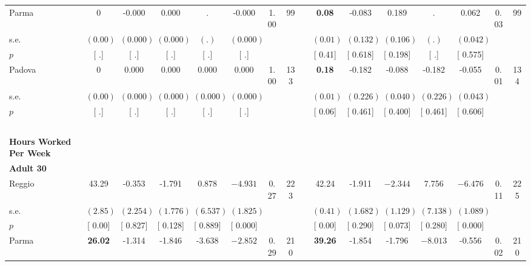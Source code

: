 \begin{longtable}{L{8em} c c c c c c c p{1em} c c c c c c c}
\quad \quad \quad Parma& 0 &    -0.000 &     0.000 &         . &    -0.000 &      1.00 &        99 & & \textbf{     0.08} &    -0.083 &     0.189 &         . &     0.062 &      0.03 &        99  \\*
\quad \quad \quad \quad s.e.& $ (     0.00)$ & $ (    0.000)$ & $ (    0.000)$ & $ (        .)$ & $ (    0.000)$ & & & & $ (     0.01)$ & $ (    0.132)$ & $ (    0.106)$ & $ (        .)$ & $ (    0.042)$ & &  \\*
\quad \quad \quad \quad $ p$ & [        .] & [        .] & [        .] & [        .] & [        .] & & & & [     0.41] & [    0.618] & [    0.198] & [        .] & [    0.575] & &  \\[1em]
\quad \quad \quad Padova& 0 &     0.000 &     0.000 &     0.000 &     0.000 &      1.00 &       133 & & \textbf{     0.18} &    -0.182 &    -0.088 &    -0.182 &    -0.055 &      0.01 &       134  \\*
\quad \quad \quad \quad s.e.& $ (     0.00)$ & $ (    0.000)$ & $ (    0.000)$ & $ (    0.000)$ & $ (    0.000)$ & & & & $ (     0.01)$ & $ (    0.226)$ & $ (    0.040)$ & $ (    0.226)$ & $ (    0.043)$ & &  \\*
\quad \quad \quad \quad $ p$ & [        .] & [        .] & [        .] & [        .] & [        .] & & & & [     0.06] & [    0.461] & [    0.400] & [    0.461] & [    0.606] & &  \\[1em]
~\\[1em]
\textbf{Hours Worked Per Week} \\*
\quad \quad \textbf{Adult 30} & & & & & & & & & & & & & & & \\* 
\quad \quad \quad Reggio& 43.29 &    -0.353 &    -1.791 &     0.878 & $ \mathbf{   -4.931}$ &      0.27 &       223 & & 42.24 &    -1.911 & $ \mathbf{   -2.344}$ &     7.756 & $ \mathbf{   -6.476}$ &      0.11 &       225  \\*
\quad \quad \quad \quad s.e.& $ (     2.85)$ & $ (    2.254)$ & $ (    1.776)$ & $ (    6.537)$ & $ (    1.825)$ & & & & $ (     0.41)$ & $ (    1.682)$ & $ (    1.129)$ & $ (    7.138)$ & $ (    1.089)$ & &  \\*
\quad \quad \quad \quad $ p$ & [     0.00] & [    0.827] & [    0.128] & [    0.889] & [    0.000] & & & & [     0.00] & [    0.290] & [    0.073] & [    0.280] & [    0.000] & &  \\[1em]
\quad \quad \quad Parma& \textbf{    26.02} &    -1.314 &    -1.846 &    -3.638 & $ \mathbf{   -2.852}$ &      0.29 &       210 & & \textbf{    39.26} &    -1.854 &    -1.796 & $ \mathbf{   -8.013}$ &    -0.556 &      0.02 &       210  \\*

\end{longtable}
